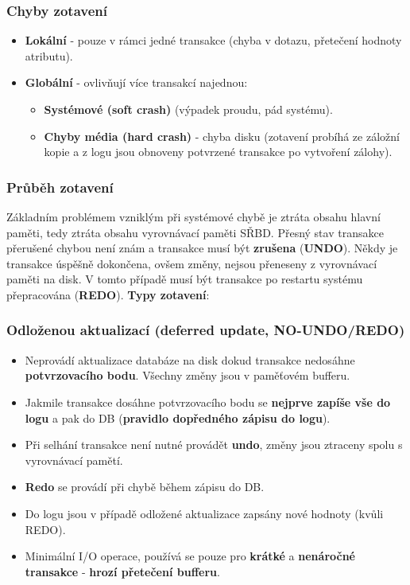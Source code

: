 \subsubsection{Chyby zotavení}
\begin{itemize}
\item\textbf{Lokální} - pouze v rámci jedné transakce (chyba v dotazu, přetečení hodnoty atributu).
\item\textbf{Globální} - ovlivňují více transakcí najednou:
\begin{itemize}
\item\textbf{Systémové (soft crash)} (výpadek proudu, pád systému).
\item\textbf{Chyby média (hard crash)} - chyba disku (zotavení probíhá ze záložní kopie a z logu jsou obnoveny potvrzené transakce po vytvoření zálohy).
\end{itemize}
\end{itemize}

\subsubsection{Průběh zotavení}
Základním problémem vzniklým při systémové chybě je ztráta obsahu hlavní paměti, tedy ztráta obsahu vyrovnávací paměti SŘBD. Přesný stav transakce přerušené chybou není znám a transakce musí být \textbf{zrušena} (\textbf{UNDO}). Někdy je transakce úspěšně dokončena, ovšem změny, nejsou přeneseny z vyrovnávací paměti na disk. V tomto případě musí být transakce po restartu systému přepracována (\textbf{REDO}). \textbf{Typy zotavení}: 

\subsubsection*{Odloženou aktualizací (deferred update, NO-UNDO/REDO)}
\begin{itemize}
\item Neprovádí aktualizace databáze na disk dokud transakce nedosáhne\textbf{ potvrzovacího bodu}. Všechny změny jsou v paměťovém bufferu.
\item Jakmile transakce dosáhne potvrzovacího bodu se \textbf{nejprve zapíše vše do logu} a pak do DB (\textbf{pravidlo dopředného zápisu do logu}).
\item Při selhání transakce není nutné provádět \textbf{undo}, změny jsou ztraceny spolu s vyrovnávací pamětí.
\item \textbf{Redo} se provádí při chybě během zápisu do DB.
\item Do logu jsou v případě odložené aktualizace zapsány nové hodnoty (kvůli REDO).
\item Minimální I/O operace, používá se pouze pro \textbf{krátké} a \textbf{nenáročné transakce} - \textbf{hrozí přetečení bufferu}.
\end{itemize}
